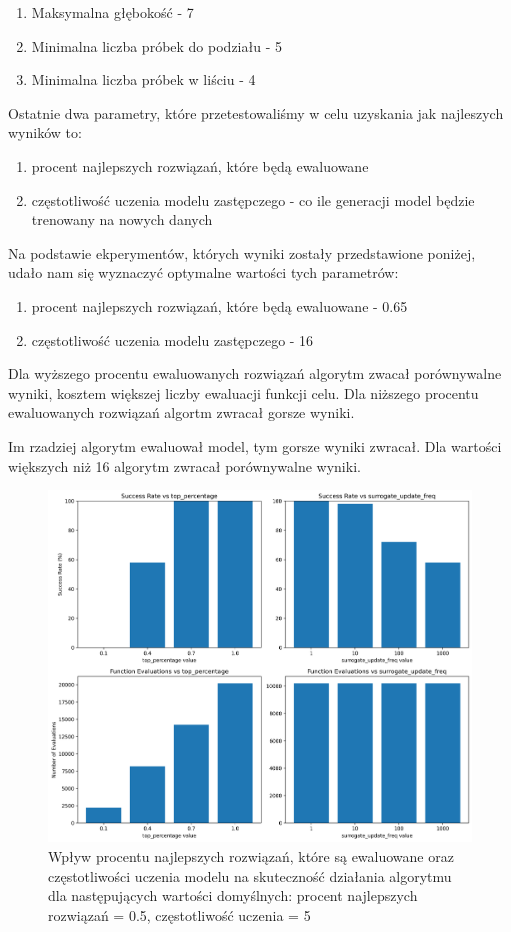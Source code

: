 \documentclass{article}
\begin{document}
\begin{enumerate}
    \item Maksymalna głębokość - 7
    \item Minimalna liczba próbek do podziału - 5
    \item Minimalna liczba próbek w liściu - 4
\end{enumerate}

Ostatnie dwa parametry, które przetestowaliśmy w celu uzyskania jak najleszych wyników to:
\begin{enumerate}
    \item procent najlepszych rozwiązań, które będą ewaluowane
    \item częstotliwość uczenia modelu zastępczego - co ile generacji model będzie trenowany na nowych danych
\end{enumerate}

Na podstawie ekperymentów, których wyniki zostały przedstawione poniżej, udało nam się wyznaczyć optymalne wartości tych parametrów:
\begin{enumerate}
    \item procent najlepszych rozwiązań, które będą ewaluowane - 0.65
    \item częstotliwość uczenia modelu zastępczego - 16
\end{enumerate}

Dla wyższego procentu ewaluowanych rozwiązań algorytm zwacał porównywalne wyniki, kosztem większej liczby ewaluacji funkcji celu. Dla niższego procentu ewaluowanych rozwiązań algortm zwracał gorsze wyniki.

Im rzadziej algorytm ewaluował model, tym gorsze wyniki zwracał. Dla wartości większych niż 16 algorytm zwracał porównywalne wyniki.


\begin{figure}[H]
    \centering
    \includegraphics[width=\textwidth]{surrogate_de_parameter_tuning_results1.png}
    \caption{Wpływ procentu najlepszych rozwiązań, które są ewaluowane oraz częstotliwości uczenia modelu na skuteczność działania algorytmu dla następujących wartości domyślnych: procent najlepszych rozwiązań = 0.5, częstotliwość uczenia = 5}
    \label{fig:surogate_de_parameter_results1}
\end{figure}
\end{document}
